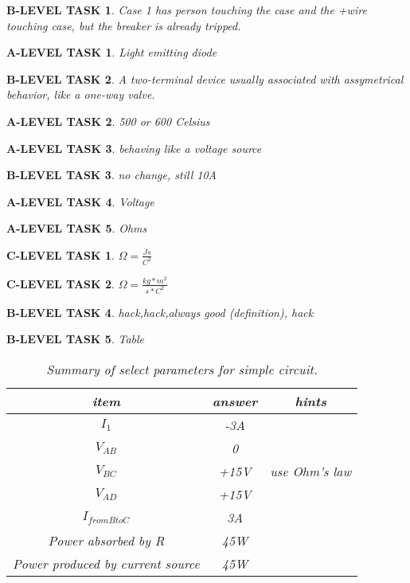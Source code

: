\documentclass{book}
\numberwithin{equation}{section}
\newtheorem{alevel}{A-LEVEL TASK}
\newtheorem{blevel}{B-LEVEL TASK}
\newtheorem{clevel}{C-LEVEL TASK}
\theoremstyle{definition}
\begin{document}
\begin{blevel}Case 1 has person touching the case and the +wire touching case, but the breaker is already tripped.\end{blevel}
\begin{alevel}Light emitting diode\end{alevel}
\begin{blevel}A two-terminal device usually associated with assymetrical behavior, like a one-way valve.\end{blevel}
\begin{alevel}500 or 600 Celsius\end{alevel}
\begin{alevel}behaving like a voltage source\end{alevel}
\begin{blevel}no change, still 10A\end{blevel}
\begin{alevel}Voltage\end{alevel}
\begin{alevel}Ohms\end{alevel}
\begin{clevel}$\Omega=\frac{Js}{C^2}$\end{clevel}
\begin{clevel}$\Omega=\frac{kg*m^2}{s*C^2}$\end{clevel}
\begin{blevel}hack,hack,always good (definition), hack\end{blevel}

\begin{blevel}Table\par
\begin{table}[H]
\begin{center}
\begin{tabular}{|c|c|c|}\hline
item&answer&hints\\ \hline
$I_1$	&-3A	&	\\ \hline
$V_{AB}$	&0	&	\\ \hline
$V_{BC}$	&+15V	& use Ohm's law	\\ \hline
$V_{AD}$	&+15V	&	\\ \hline
$I_{from B to C}$	&3A	&	\\ \hline
Power absorbed by R	&45W	&	\\ \hline
Power produced by current source	&45W	&	\\ \hline
\end{tabular}
\label{T:21}
\caption{Summary of select parameters for simple circuit.}
\end{center}
\end{table}
\end{blevel}
\end{document}
